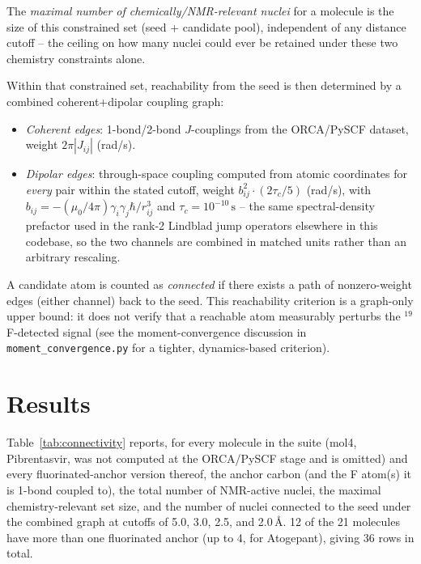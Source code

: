 \documentclass[11pt]{article}
\begin{document}
The \emph{maximal number of chemically/NMR-relevant nuclei} for a molecule
is the size of this constrained set (seed + candidate pool), independent of
any distance cutoff -- the ceiling on how many nuclei could ever be
retained under these two chemistry constraints alone.

Within that constrained set, reachability from the seed is then determined
by a combined coherent+dipolar coupling graph:
\begin{itemize}
\item \emph{Coherent edges}: 1-bond/2-bond $J$-couplings from the ORCA/PySCF
  dataset, weight $2\pi|J_{ij}|$ (rad/s).
\item \emph{Dipolar edges}: through-space coupling computed from atomic
  coordinates for \emph{every} pair within the stated cutoff, weight
  $b_{ij}^{2}\cdot(2\tau_c/5)$ (rad/s), with
  $b_{ij}=-(\mu_0/4\pi)\gamma_i\gamma_j\hbar/r_{ij}^{3}$ and
  $\tau_c=10^{-10}\,\mathrm{s}$ -- the same spectral-density prefactor used
  in the rank-2 Lindblad jump operators elsewhere in this codebase, so the
  two channels are combined in matched units rather than an arbitrary
  rescaling.
\end{itemize}
A candidate atom is counted as \emph{connected} if there exists a path of
nonzero-weight edges (either channel) back to the seed. This reachability
criterion is a graph-only upper bound: it does not verify that a reachable
atom measurably perturbs the $^{19}$F-detected signal (see the
moment-convergence discussion in \texttt{moment\_convergence.py} for a
tighter, dynamics-based criterion).

\section{Results}

Table~\ref{tab:connectivity} reports, for every molecule in the suite
(mol4, Pibrentasvir, was not computed at the ORCA/PySCF stage and is
omitted) and every fluorinated-anchor version thereof, the anchor carbon
(and the F atom(s) it is 1-bond coupled to), the total number of NMR-active
nuclei, the maximal chemistry-relevant set size, and the number of nuclei
connected to the seed under the combined graph at cutoffs of 5.0, 3.0, 2.5,
and 2.0\,\AA. 12 of the 21 molecules have more than one fluorinated anchor
(up to 4, for Atogepant), giving 36 rows in total.
\end{document}
